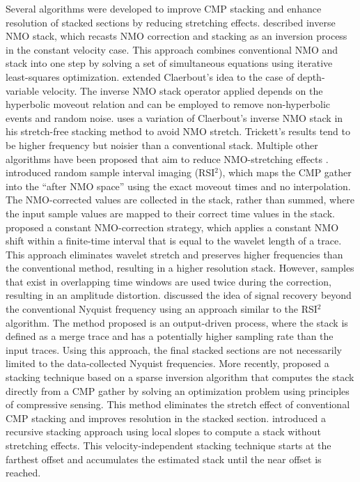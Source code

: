 Several algorithms were developed to improve CMP stacking and enhance resolution 
of stacked sections by reducing stretching effects. 
\cite{claerbout} described inverse NMO stack, which recasts 
NMO correction and stacking as an inversion process in the constant velocity case. This approach 
combines conventional NMO and stack into one step by solving a set of simultaneous equations using
iterative least-squares optimization. 
\cite{sun} extended Claerbout's idea to the case of depth-variable 
velocity. The inverse NMO stack operator applied depends on the hyperbolic moveout relation and can 
be employed to remove non-hyperbolic events and random noise. 
\cite{trickett} uses a variation of Claerbout's inverse NMO stack in his stretch-free stacking method 
to avoid NMO stretch. Trickett's results tend to be higher frequency but noisier 
than a conventional stack. Multiple other algorithms have been proposed that aim to reduce 
NMO-stretching effects \cite[]{byun,hicks,hilterman,rupert,perroud,masoomzadeh,zhang,kazemi}.
\cite{wisecup} introduced random sample interval imaging (RSI$^2$), which
maps the CMP gather into the ``after NMO space'' using the exact moveout times and no 
interpolation. The NMO-corrected values are collected in the stack, rather than 
summed, where the input sample values are mapped to their correct time values in the stack. 
\cite{shatilo} proposed a constant NMO-correction strategy, which applies a constant NMO shift 
within a finite-time interval that is equal to the wavelet length of a trace. This approach eliminates wavelet 
stretch and preserves higher frequencies than the conventional method, resulting in a higher resolution stack. However, 
samples that exist in overlapping time windows are used twice during the correction, resulting in 
an amplitude distortion.
\cite{stark} discussed the idea of signal recovery beyond the conventional Nyquist 
frequency using an approach similar to the RSI$^2$ algorithm. The method proposed is an output-driven process, 
where the stack is defined as a merge trace and has a potentially higher sampling rate than the input 
traces. Using this approach, the final stacked sections are not necessarily limited to the data-collected Nyquist frequencies.
More recently, \cite{ma} proposed a stacking technique based 
on a sparse inversion algorithm that computes the stack directly from a CMP gather by solving an optimization 
problem using principles of compressive sensing. This method eliminates the stretch effect of conventional 
CMP stacking and improves resolution in the stacked section. 
\cite{silva} introduced a recursive stacking approach using local slopes to compute a stack without stretching effects. 
This velocity-independent stacking technique starts at the farthest offset and accumulates the estimated stack until the near offset is reached. 


